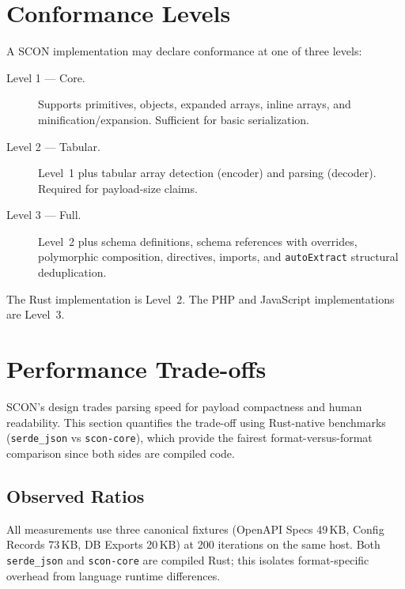 \documentclass[11pt, a4paper]{article}
\begin{document}
\section{Conformance Levels}
\label{sec:conformance}

A SCON implementation may declare conformance at one of three levels:

\begin{description}
\item[Level 1 --- Core.]
  Supports primitives, objects, expanded arrays, inline arrays, and
  minification/expansion. Sufficient for basic serialization.

\item[Level 2 --- Tabular.]
  Level~1 plus tabular array detection (encoder) and parsing (decoder).
  Required for payload-size claims.

\item[Level 3 --- Full.]
  Level~2 plus schema definitions, schema references with overrides,
  polymorphic composition, directives, imports, and \texttt{autoExtract}
  structural deduplication.
\end{description}

\noindent The Rust implementation is Level~2. The PHP and JavaScript
implementations are Level~3.

\section{Performance Trade-offs}
\label{sec:performance}

SCON's design trades parsing speed for payload compactness and human readability.
This section quantifies the trade-off using Rust-native benchmarks
(\texttt{serde\_json} vs \texttt{scon-core}), which provide the fairest
format-versus-format comparison since both sides are compiled code.

\subsection{Observed Ratios}
\label{sec:ratios}

All measurements use three canonical fixtures (OpenAPI Specs 49\,KB, Config
Records 73\,KB, DB Exports 20\,KB) at 200 iterations on the same host.
Both \texttt{serde\_json} and \texttt{scon-core} are compiled Rust;
this isolates format-specific overhead from language runtime differences.
\end{document}
